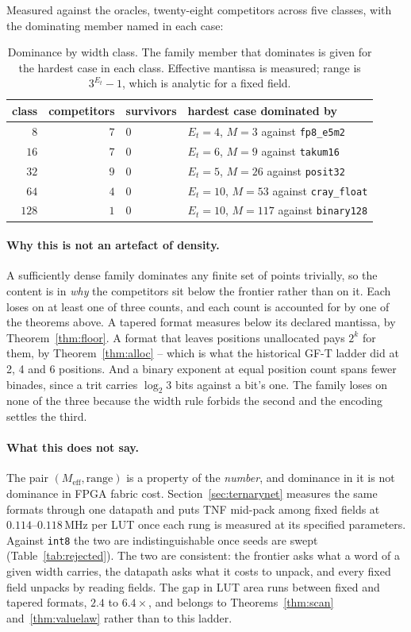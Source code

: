 \documentclass[11pt]{article}
\theoremstyle{definition}
\begin{document}
Measured against the oracles, twenty-eight competitors across five classes, with
the dominating member named in each case:

\begin{table}[t]\centering
\caption{Dominance by width class. The family member that dominates is given for
the hardest case in each class. Effective mantissa is measured; range is
$3^{E_t}-1$, which is analytic for a fixed field.}
\label{tab:nosurvivors}
\begin{tabular}{rrll}
\toprule
class & competitors & survivors & hardest case dominated by \\
\midrule
$8$   & $7$ & $0$ & $E_t{=}4$, $M{=}3$ against \texttt{fp8\_e5m2} \\
$16$  & $7$ & $0$ & $E_t{=}6$, $M{=}9$ against \texttt{takum16} \\
$32$  & $9$ & $0$ & $E_t{=}5$, $M{=}26$ against \texttt{posit32} \\
$64$  & $4$ & $0$ & $E_t{=}10$, $M{=}53$ against \texttt{cray\_float} \\
$128$ & $1$ & $0$ & $E_t{=}10$, $M{=}117$ against \texttt{binary128} \\
\bottomrule
\end{tabular}
\end{table}

\paragraph{Why this is not an artefact of density.} A sufficiently dense family
dominates any finite set of points trivially, so the content is in \emph{why} the
competitors sit below the frontier rather than on it. Each loses on at least one
of three counts, and each count is accounted for by one of the theorems above. A tapered format
measures below its declared mantissa, by Theorem~\ref{thm:floor}. A format that
leaves positions unallocated pays $2^k$ for them, by Theorem~\ref{thm:alloc} --
which is what the historical GF-T ladder did at 2, 4 and 6 positions. And a binary
exponent at equal position count spans fewer binades, since a trit carries
$\log_2 3$ bits against a bit's one. The family loses on none of the three because
the width rule forbids the second and the encoding settles the third.

\paragraph{What this does not say.} The pair $(M_{\mathrm{eff}}, \text{range})$ is
a property of the \emph{number}, and dominance in it is not dominance in FPGA fabric cost.
Section~\ref{sec:ternarynet} measures the same formats through one datapath and
puts TNF mid-pack among fixed fields at $0.114$--$0.118$\,MHz per LUT once
each rung is measured at its specified parameters. Against
\texttt{int8} the two are indistinguishable once seeds are swept
(Table~\ref{tab:rejected}). The two are consistent: the frontier asks what a word of
a given width carries, the datapath asks what it costs to unpack, and every fixed
field unpacks by reading fields. The gap in LUT area runs between fixed and tapered
formats, $2.4$ to $6.4\times$, and belongs to Theorems~\ref{thm:scan}
and~\ref{thm:valuelaw} rather than to this ladder.
\end{document}
